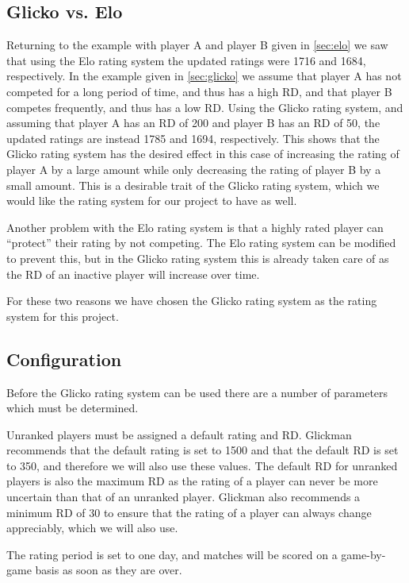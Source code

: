 \subsection{Glicko vs. Elo}
Returning to the example with player A and player B given in \autoref{sec:elo} we saw that using the Elo rating system the updated ratings were 1716 and 1684, respectively.
In the example given in \autoref{sec:glicko} we assume that player A has not competed for a long period of time, and thus has a high RD, and that player B competes frequently, and thus has a low RD.
Using the Glicko rating system, and assuming that player A has an RD of 200 and player B has an RD of 50, the updated ratings are instead 1785 and 1694, respectively.
This shows that the Glicko rating system has the desired effect in this case of increasing the rating of player A by a large amount while only decreasing the rating of player B by a small amount.
This is a desirable trait of the Glicko rating system, which we would like the rating system for our project to have as well.

Another problem with the Elo rating system is that a highly rated player can ``protect'' their rating by not competing.
The Elo rating system can be modified to prevent this, but in the Glicko rating system this is already taken care of as the RD of an inactive player will increase over time.

For these two reasons we have chosen the Glicko rating system as the rating system for this project. 

\subsection{Configuration}
\label{sec:glicko_config}
Before the Glicko rating system can be used there are a number of parameters which must be determined.

Unranked players must be assigned a default rating and RD.
Glickman recommends that the default rating is set to 1500 and that the default RD is set to 350, and therefore we will also use these values.
The default RD for unranked players is also the maximum RD as the rating of a player can never be more uncertain than that of an unranked player.
Glickman also recommends a minimum RD of 30 to ensure that the rating of a player can always change appreciably, which we will also use.

The rating period is set to one day, and matches will be scored on a game-by-game basis as soon as they are over.

